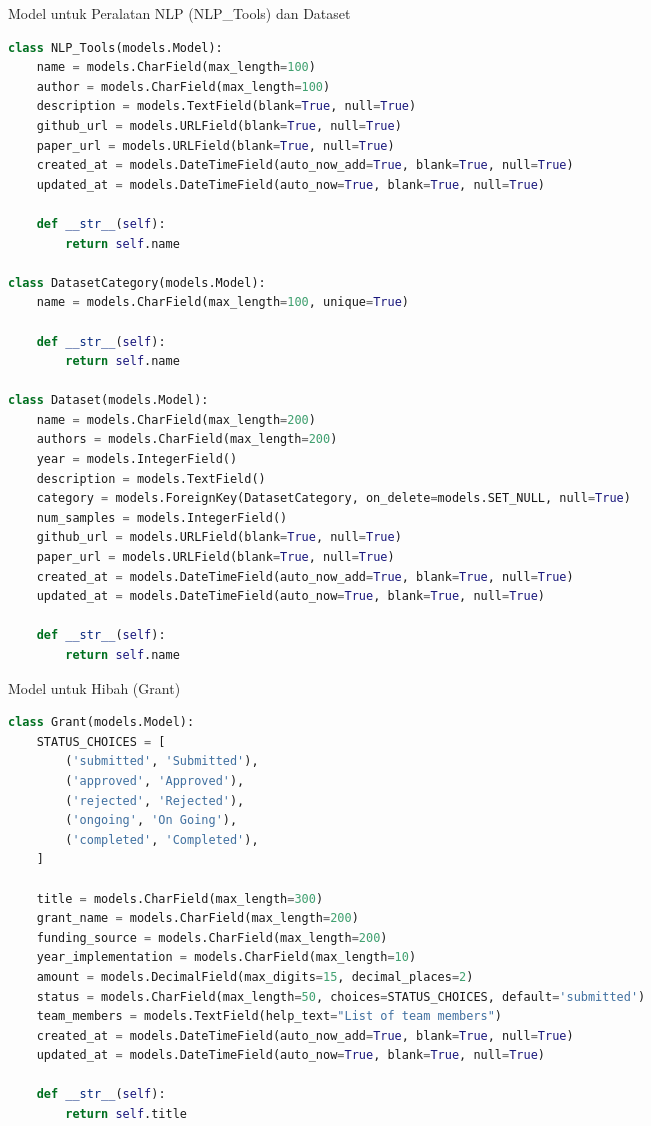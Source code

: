 \begin{listing}[H]
\caption{Model untuk Peralatan NLP (NLP\_Tools) dan Dataset}
\label{lst:nlp_tools_datasets}
\begin{lstlisting}[language=Python]
class NLP_Tools(models.Model):
    name = models.CharField(max_length=100)
    author = models.CharField(max_length=100)
    description = models.TextField(blank=True, null=True)
    github_url = models.URLField(blank=True, null=True)
    paper_url = models.URLField(blank=True, null=True)
    created_at = models.DateTimeField(auto_now_add=True, blank=True, null=True)
    updated_at = models.DateTimeField(auto_now=True, blank=True, null=True)

    def __str__(self):
        return self.name
    
class DatasetCategory(models.Model):
    name = models.CharField(max_length=100, unique=True)

    def __str__(self):
        return self.name

class Dataset(models.Model):
    name = models.CharField(max_length=200)
    authors = models.CharField(max_length=200)
    year = models.IntegerField()
    description = models.TextField()
    category = models.ForeignKey(DatasetCategory, on_delete=models.SET_NULL, null=True)
    num_samples = models.IntegerField()
    github_url = models.URLField(blank=True, null=True)
    paper_url = models.URLField(blank=True, null=True)
    created_at = models.DateTimeField(auto_now_add=True, blank=True, null=True)
    updated_at = models.DateTimeField(auto_now=True, blank=True, null=True)

    def __str__(self):
        return self.name
\end{lstlisting}
\end{listing}

\begin{listing}[H]
\caption{Model untuk Hibah (Grant)}
\label{lst:grant}
\begin{lstlisting}[language=Python]
class Grant(models.Model):
    STATUS_CHOICES = [
        ('submitted', 'Submitted'),
        ('approved', 'Approved'),
        ('rejected', 'Rejected'),
        ('ongoing', 'On Going'),
        ('completed', 'Completed'),
    ]

    title = models.CharField(max_length=300)
    grant_name = models.CharField(max_length=200)
    funding_source = models.CharField(max_length=200)
    year_implementation = models.CharField(max_length=10)
    amount = models.DecimalField(max_digits=15, decimal_places=2)
    status = models.CharField(max_length=50, choices=STATUS_CHOICES, default='submitted')
    team_members = models.TextField(help_text="List of team members")
    created_at = models.DateTimeField(auto_now_add=True, blank=True, null=True)
    updated_at = models.DateTimeField(auto_now=True, blank=True, null=True)

    def __str__(self):
        return self.title
\end{lstlisting}
\end{listing}

